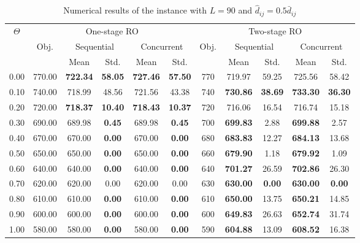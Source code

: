 \documentclass[preprint,review,10pt,round,authoryear]{elsarticle}\usepackage[]{graphicx}\usepackage[]{color}
\theoremstyle{plain}
\theoremstyle{definition}
\theoremstyle{remark}
\begin{document}
\begin{table*}[!ht]
\small
      \caption{Numerical results of the instance with $L=90$ and $\hat{d}_{ij}= 0.5\bar{d}_{ij} $}
      \begin{center}
      \begin{tabular}{||c| c| c| c| c| c| c| c| c|c|c||}
      \hline
      \hline
      \multirow{3}{*}{$\Theta$} &
      \multicolumn{5}{|c|}{One-stage RO} &
      \multicolumn{5}{|c||}{Two-stage RO} \\
      \cline{2-6}
      \cline{7-11}
      &\multirow{2}{*}{Obj.} &
      \multicolumn{2}{|c|}{Sequential} &
      \multicolumn{2}{|c|}{Concurrent} &
      \multirow{2}{*}{Obj.} &
      \multicolumn{2}{|c|}{Sequential} &
      \multicolumn{2}{|c||}{Concurrent}\\
      \cline{3-6}
      \cline{8-11}
      &&Mean&Std.&Mean&Std.&&Mean&Std.&Mean&Std.\\
      \hline%
  \hline
0.00 & 770.00 & \textbf{722.34} & \textbf{58.05 }& \textbf{727.46} & \textbf{57.50} & 770 & 719.97 & 59.25 & 725.56 & 58.42 \\ 
   \hline
0.10 & 740.00 & 718.99 & 48.56 & 721.56 & 43.38 & 740 & \textbf{730.86} & \textbf{38.69} & \textbf{733.30} & \textbf{36.30} \\ 
   \hline
0.20 & 720.00 & \textbf{718.37} & \textbf{10.40} & \textbf{718.43} & \textbf{10.37} & 720 & 716.06 & 16.54 & 716.74 & 15.18 \\ 
   \hline
0.30 & 690.00 & 689.98 & \textbf{0.45 }& 689.98 & \textbf{0.45} & 700 & \textbf{699.83} & 2.88 & \textbf{699.88} & 2.57 \\ 
   \hline
0.40 & 670.00 & 670.00 & \textbf{0.00} & 670.00 & \textbf{0.00} & 680 & \textbf{683.83} & 12.27 & \textbf{684.13} & 13.68 \\ 
   \hline
0.50 & 650.00 & 650.00 & \textbf{0.00} & 650.00 & \textbf{0.00} & 660 & \textbf{679.90} & 1.18 & \textbf{679.92} & 1.09 \\ 
   \hline
0.60 & 640.00 & 640.00 & \textbf{0.00} & 640.00 & \textbf{0.00} & 640 & \textbf{701.27} & 26.59 & \textbf{702.86} & 26.30 \\ 
   \hline
0.70 & 620.00 & 620.00 & 0.00 & 620.00 & 0.00 & 630 & \textbf{630.00} & \textbf{0.00} & \textbf{630.00} & \textbf{0.00} \\ 
   \hline
0.80 & 610.00 & 610.00 & \textbf{0.00} & 610.00 & \textbf{0.00} & 610 & \textbf{650.00} & 13.75 & \textbf{650.21} & 14.85 \\ 
   \hline
0.90 & 600.00 & 600.00 & \textbf{0.00 }& 600.00 & \textbf{0.00} & 600 & \textbf{649.83} & 26.63 & \textbf{652.74} & 31.74 \\ 
   \hline
1.00 & 580.00 & 580.00 & \textbf{0.00} & 580.00 & \textbf{0.00} & 590 & \textbf{604.88} & 13.09 & \textbf{608.52} & 16.38 \\ 
  \hline
\hline
      \end{tabular}
      \end{center}
      \label{table:4}
      \end{table*}
\end{document}
